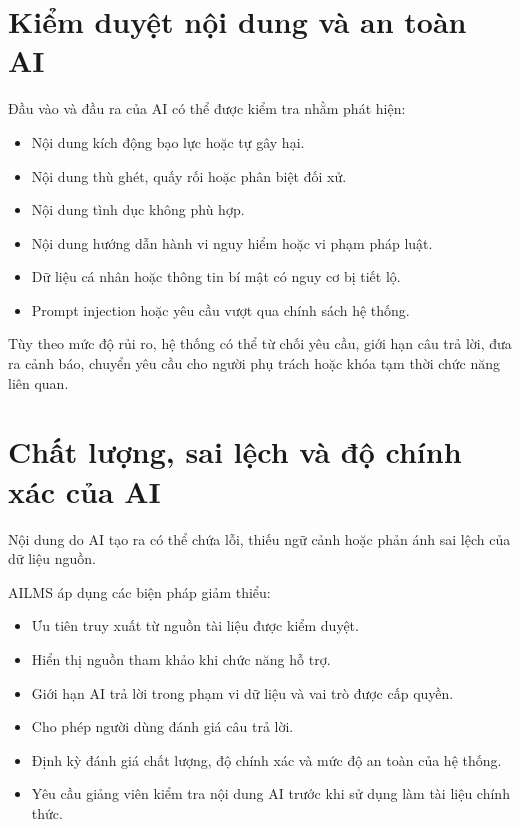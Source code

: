 \documentclass[12pt,a4paper]{article}
\begin{document}
\section{Kiểm duyệt nội dung và an toàn AI}

Đầu vào và đầu ra của AI có thể được kiểm tra nhằm phát hiện:

\begin{itemize}
    \item Nội dung kích động bạo lực hoặc tự gây hại.
    \item Nội dung thù ghét, quấy rối hoặc phân biệt đối xử.
    \item Nội dung tình dục không phù hợp.
    \item Nội dung hướng dẫn hành vi nguy hiểm hoặc vi phạm pháp luật.
    \item Dữ liệu cá nhân hoặc thông tin bí mật có nguy cơ bị tiết lộ.
    \item Prompt injection hoặc yêu cầu vượt qua chính sách hệ thống.
\end{itemize}

Tùy theo mức độ rủi ro, hệ thống có thể từ chối yêu cầu, giới hạn câu trả lời,
đưa ra cảnh báo, chuyển yêu cầu cho người phụ trách hoặc khóa tạm thời chức năng liên quan.

\section{Chất lượng, sai lệch và độ chính xác của AI}

Nội dung do AI tạo ra có thể chứa lỗi, thiếu ngữ cảnh hoặc phản ánh sai lệch của dữ liệu nguồn.

AILMS áp dụng các biện pháp giảm thiểu:

\begin{itemize}
    \item Ưu tiên truy xuất từ nguồn tài liệu được kiểm duyệt.
    \item Hiển thị nguồn tham khảo khi chức năng hỗ trợ.
    \item Giới hạn AI trả lời trong phạm vi dữ liệu và vai trò được cấp quyền.
    \item Cho phép người dùng đánh giá câu trả lời.
    \item Định kỳ đánh giá chất lượng, độ chính xác và mức độ an toàn của hệ thống.
    \item Yêu cầu giảng viên kiểm tra nội dung AI trước khi sử dụng làm tài liệu chính thức.
\end{itemize}
\end{document}
